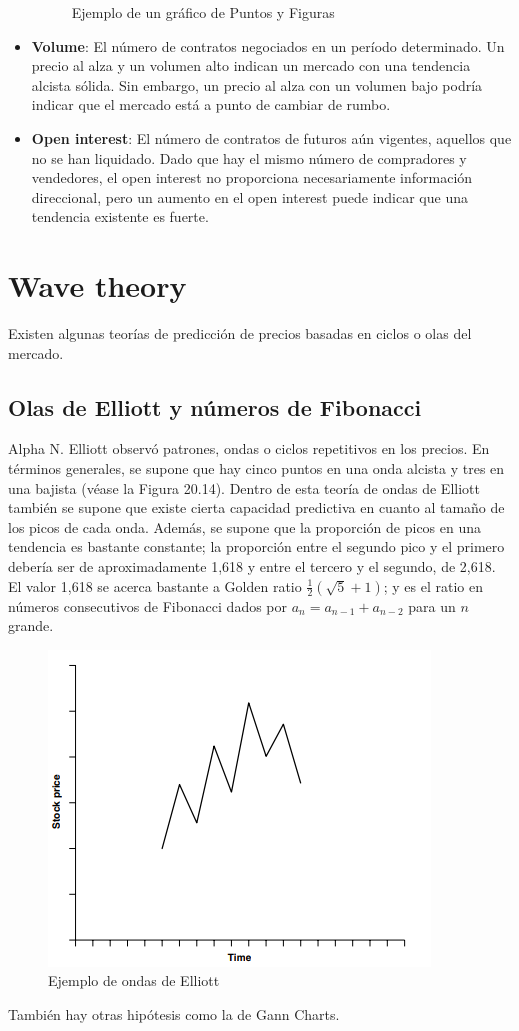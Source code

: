 \begin{itemize}
\begin{figure}[H]
            \caption{Ejemplo de un gráfico de Puntos y Figuras}
        \end{figure}
    \item \textbf{Volume}: El número de contratos negociados en un período determinado. Un precio al alza y un volumen alto indican un mercado con una tendencia alcista sólida. Sin embargo, un precio al alza con un volumen bajo podría indicar que el mercado está a punto de cambiar de rumbo.
    \item \textbf{Open interest}: El número de contratos de futuros aún vigentes, aquellos que no se han liquidado. Dado que hay el mismo número de compradores y vendedores, el open interest no proporciona necesariamente información direccional, pero un aumento en el open interest puede indicar que una tendencia existente es fuerte.
\end{itemize}





\section{Wave theory}
Existen algunas teorías de predicción de precios basadas en ciclos o olas del mercado.

\subsection{Olas de Elliott y números de Fibonacci}
Alpha N. Elliott observó patrones, ondas o ciclos repetitivos en los precios. En términos generales, se supone que hay cinco puntos en una onda alcista y tres en una bajista (véase la Figura 20.14). Dentro de esta teoría de ondas de Elliott también se supone que existe cierta capacidad predictiva en cuanto al tamaño de los picos de cada onda. Además, se supone que la proporción de picos en una tendencia es bastante constante; la proporción entre el segundo pico y el primero debería ser de aproximadamente 1,618 y entre el tercero y el segundo, de 2,618. El valor 1,618 se acerca bastante a Golden ratio $\frac{1}{2}(\sqrt{5}+1)$; y es el ratio en números consecutivos de Fibonacci dados por $a_n = a_{n-1}+a_{n-2}$ para un $n$ grande.
\begin{figure}[H]
    \centering
    \includegraphics[width=0.65\linewidth]{Imagenes/Parte1/16_Prediccion/Elliot waves.png}
    \caption{Ejemplo de ondas de Elliott}
\end{figure}



También hay otras hipótesis como la de Gann Charts.





